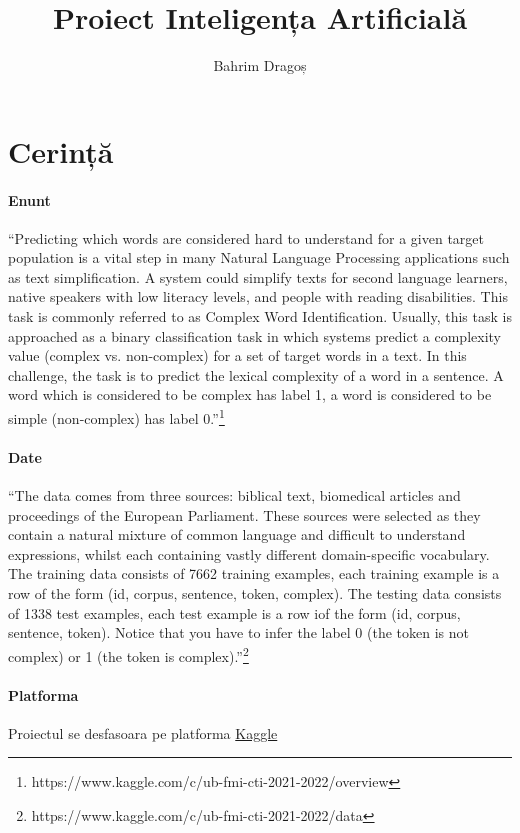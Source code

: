 \documentclass{article}
\title{Proiect Inteligența Artificială}
\author{Bahrim Dragoș}
\begin{document}
 
\maketitle
\newpage
\tableofcontents
\newpage
{}
 
\section{Cerință}
\paragraph{Enunt} ``Predicting which words are considered hard to understand for a given
target population is a vital step in many Natural Language Processing
applications such as text simplification. A system could simplify texts
for second language learners, native speakers with low literacy levels,
and people with reading disabilities. This task is commonly referred
to as Complex Word Identification. Usually, this task is approached as
a binary classification task in which systems predict a complexity value
(complex vs. non-complex) for a set of target words in a text.
In this challenge, the task is to predict the lexical complexity of a word
in a sentence. A word which is considered to be complex has label 1,
a word is considered to be simple (non-complex) has label 0.''\footnote{https://www.kaggle.com/c/ub-fmi-cti-2021-2022/overview}
\paragraph{Date} ``The data comes from three sources: biblical text,
biomedical articles and proceedings of the European Parliament.
These sources were selected as they contain a natural mixture of common language and difficult to understand expressions, whilst each containing vastly different domain-specific vocabulary. The training data consists of 7662 training examples, each training example is a row of the form (id, corpus, sentence, token, complex). The testing data consists of 1338 test examples, each test example is a row iof the form (id, corpus, sentence, token). Notice that you have to infer the label 0 (the token is not complex) or 1 (the token is complex).''\footnote{https://www.kaggle.com/c/ub-fmi-cti-2021-2022/data}
\paragraph{Platforma} Proiectul se desfasoara pe platforma \href{https://www.kaggle.com/c/ub-fmi-cti-2021-2022/leaderboard}{Kaggle}
 
\end{document}
